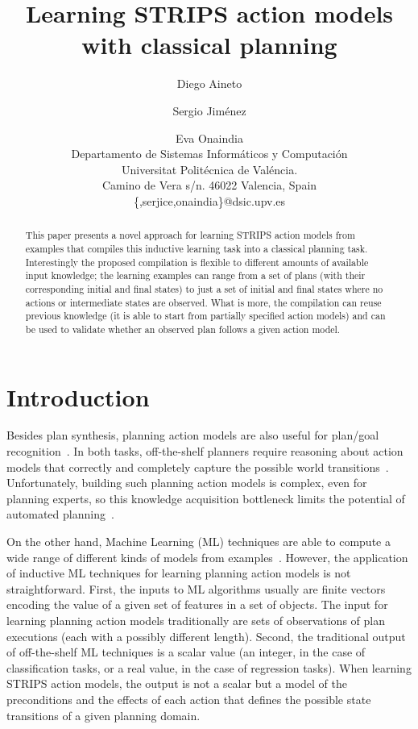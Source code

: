 \documentclass[letterpaper]{article} %
\begin{document}
\title{Learning STRIPS action models with classical planning}

\author{Diego Aineto\and Sergio Jim\'enez\and Eva Onaindia\\
{\small Departamento de Sistemas Inform\'aticos y Computaci\'on}\\
{\small Universitat Polit\'ecnica de Val\'encia.}\\
{\small Camino de Vera s/n. 46022 Valencia, Spain}\\
{\small \{,serjice,onaindia\}@dsic.upv.es}}
 
\maketitle
\begin{abstract}
This paper presents a novel approach for learning STRIPS action models from examples that compiles this inductive learning task into a classical planning task. Interestingly the proposed compilation is flexible to different amounts of available input knowledge; the learning examples can range from a set of plans (with their corresponding initial and final states) to just a set of initial and final states where no actions or intermediate states are observed. What is more, the compilation can reuse previous knowledge (it is able to start from partially specified action models) and can be used to validate whether an observed plan follows a given action model. 
\end{abstract}


\section{Introduction}
Besides plan synthesis, planning action models are also useful for plan/goal recognition~\cite{ramirez2010probabilistic}. In both tasks, off-the-shelf planners require reasoning about action models that correctly and completely capture the possible world transitions~\cite{ghallab2004automated,geffner:book:2013}. Unfortunately, building such planning action models is complex, even for planning experts, so this knowledge acquisition bottleneck limits the potential of automated planning~\cite{kambhampati:modellite:AAAI2007}.  

On the other hand, Machine Learning (ML) techniques are able to compute a wide range of different kinds of models from examples~\cite{michalski2013machine}. However, the application of inductive ML techniques for learning planning action models is not straightforward. First, the inputs to ML algorithms usually are finite vectors encoding the value of a given set of features in a set of objects. The input for learning planning action models traditionally are sets of observations of plan executions (each with a possibly different length). Second, the traditional output of off-the-shelf ML techniques is a scalar value (an integer, in the case of classification tasks, or a real value, in the case of regression tasks). When learning STRIPS action models, the output is not a scalar but a model of the preconditions and the effects of each action that defines the possible state transitions of a given planning domain. 
\end{document}
